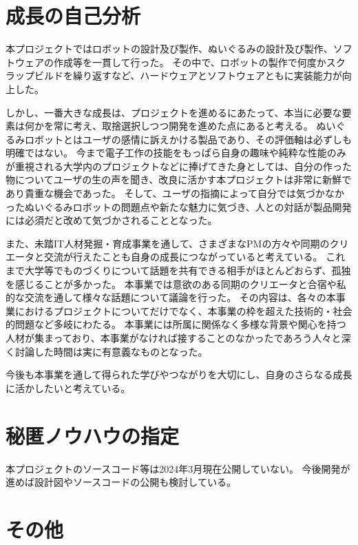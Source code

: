 \documentclass[uplatex,a4paper,12pt]{jsarticle}
\begin{document}

\section{成長の自己分析}
本プロジェクトではロボットの設計及び製作、ぬいぐるみの設計及び製作、ソフトウェアの作成等を一貫して行った。
その中で、ロボットの製作で何度かスクラップビルドを繰り返すなど、ハードウェアとソフトウェアともに実装能力が向上した。

しかし、一番大きな成長は、プロジェクトを進めるにあたって、本当に必要な要素は何かを常に考え、取捨選択しつつ開発を進めた点にあると考える。
ぬいぐるみロボットとはユーザの感情に訴えかける製品であり、その評価軸は必ずしも明確ではない。
今まで電子工作の技能をもっぱら自身の趣味や純粋な性能のみが重視される大学内のプロジェクトなどに捧げてきた身としては、自分の作った物についてユーザの生の声を聞き、改良に活かす本プロジェクトは非常に新鮮であり貴重な機会であった。
そして、ユーザの指摘によって自分では気づかなかったぬいぐるみロボットの問題点や新たな魅力に気づき、人との対話が製品開発には必須だと改めて気づかされることとなった。

また、未踏IT人材発掘・育成事業を通して、さまざまなPMの方々や同期のクリエータと交流が行えたことも自身の成長につながっていると考えている。
これまで大学等でものづくりについて話題を共有できる相手がほとんどおらず、孤独を感じることが多かった。
本事業では意欲のある同期のクリエータと合宿や私的な交流を通して様々な話題について議論を行った。
その内容は、各々の本事業におけるプロジェクトについてだけでなく、本事業の枠を超えた技術的・社会的問題など多岐にわたる。
本事業には所属に関係なく多様な背景や関心を持つ人材が集まっており、本事業がなければ接することのなかったであろう人々と深く討論した時間は実に有意義なものとなった。

今後も本事業を通して得られた学びやつながりを大切にし、自身のさらなる成長に活かしたいと考えている。


\section{秘匿ノウハウの指定}
本プロジェクトのソースコード等は2024年3月現在公開していない。
今後開発が進めば設計図やソースコードの公開も検討している。

\section{その他}
\end{document}
